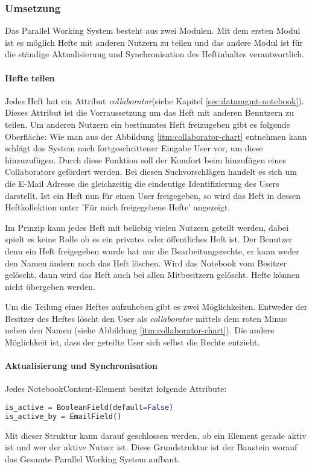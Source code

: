\subsubsection{Umsetzung}
Das Parallel Working System besteht aus zwei Modulen. Mit dem ersten Modul ist es möglich Hefte mit anderen Nutzern zu teilen und das andere Modul ist für die ständige Aktualisierung und Synchronisation des Heftinhaltes verantwortlich. 
\paragraph{Hefte teilen}
Jedes Heft hat ein Attribut \textit{collaborator}(siehe Kapitel \ref{sec:datamgmt-notebook}). Dieses Attribut ist die Vorraussetzung um das Heft mit anderen Benutzern zu teilen. 
Um anderen Nutzern ein bestimmtes Heft freizugeben gibt es folgende Oberfläche:
Wie man aus der Abbildung \ref{itm:collaborator-chart} entnehmen kann schlägt das System nach fortgeschrittener Eingabe User vor, um diese hinzuzufügen. Durch diese Funktion soll der Komfort beim hinzufügen eines Collaborators gefördert werden. Bei diesen Suchvorschlägen handelt es sich um die E-Mail Adresse die gleichzeitig die eindeutige Identifizierung des Users darstellt.
Ist ein Heft nun für einen User freigegeben, so wird das Heft in dessen Heftkollektion unter 'Für mich freigegebene Hefte' angezeigt. 


\newpage

Im Prinzip kann jedes Heft mit beliebig vielen Nutzern geteilt werden, dabei spielt es keine Rolle ob es ein privates oder öffentliches Heft ist. 
Der Benutzer denn ein Heft freigegeben wurde hat nur die Bearbeitungsrechte, er kann weder den Namen ändern noch das Heft löschen. Wird das Notebook vom Besitzer gelöscht, dann wird das Heft auch bei allen Mitbesitzern gelöscht. Hefte können nicht übergeben werden.

Um die Teilung eines Heftes aufzuheben gibt es zwei Möglichkeiten. Entweder der Besitzer des Heftes löscht den User als \textit{collaborator} mittels dem roten Minus neben den Namen (siehe Abbildung \ref{itm:collaborator-chart}). Die andere Möglichkeit ist, dass der geteilte User sich selbst die Rechte entzieht.
\paragraph{Aktualisierung und Synchronisation}
Jedes NotebookContent-Element besitzt folgende Attribute:
\begin{lstlisting}[caption={Parallel Working System Attribute}, language=Python]
is_active = BooleanField(default=False)
is_active_by = EmailField()
\end{lstlisting}
Mit dieser Struktur kann darauf geschlossen werden, ob ein Element gerade aktiv ist und wer der aktive Nutzer ist. Diese Grundstruktur ist der Baustein worauf das Gesamte Parallel Working System aufbaut.

